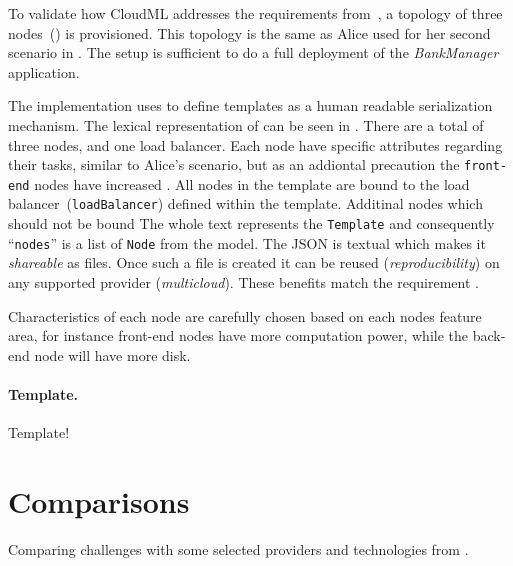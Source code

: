 
To validate how CloudML addresses the requirements from~,
a topology of three nodes~() is provisioned.
This topology is the same as Alice used for her second scenario in .
The setup is sufficient to do a full deployment of the \emph{BankManager} application.

The implementation uses  to define templates as a human readable serialization mechanism.
The lexical representation of  can be seen in . 
There are a total of three nodes, and one load balancer.
Each node have specific attributes regarding their tasks, similar to Alice's scenario,
but as an addiontal precaution the \texttt{front-end} nodes have increased .
All nodes in the template are bound to the load balancer~(\texttt{loadBalancer})
defined within the template.
Additinal nodes which should not be bound 
The whole text represents the \texttt{Template} and consequently 
``\texttt{nodes}'' is a list of \texttt{Node} from the model.
The JSON is textual which makes it \emph{shareable} as files.
Once such a file is created it can be reused (\emph{reproducibility}) 
on any supported provider (\emph{multicloud}).
These benefits match the requirement .

Characteristics of each node are carefully chosen based on each nodes feature area, for instance 
front-end nodes have more computation power, while the back-end node will have more disk.

\paragraph{Template.}


Template!

\section{Comparisons}


Comparing challenges with some selected providers and technologies from .
